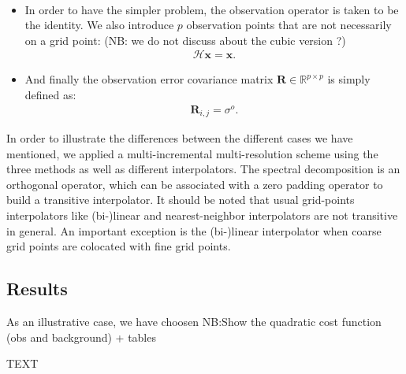 \documentclass[npg, manuscript]{copernicus}
\begin{document}
\begin{itemize}
\begin{align}
 \end{align}
 \item In order to have the simpler problem, the observation operator is taken to be the identity. We also introduce $p$ observation points that are not necessarily on a grid point: (NB: we do not discuss about the cubic version ?)
 \begin{align}
  \mathcal{H}\mathbf{x} = \mathbf{x}. 
 \end{align}
 \item And finally the observation error covariance matrix $\mathbf{R} \in \mathbb{R}^{p \times p}$ is simply defined as:
 \begin{align}
 \mathbf{R}_{i,j} = \sigma^o.
 \end{align}
\end{itemize}

In order to illustrate the differences between the different cases we have mentioned, we applied a multi-incremental multi-resolution scheme using the three methods as well as different interpolators. The spectral decomposition is an orthogonal operator, which can be associated with a zero padding operator to build a transitive interpolator. It should be noted that usual grid-points interpolators like (bi-)linear and nearest-neighbor interpolators are not transitive in general. An important exception is the (bi-)linear interpolator when coarse grid points are colocated with fine grid points.

\subsection{Results}
As an illustrative case, we have choosen 
NB:Show the quadratic cost function (obs and background) + tables



\conclusions  %
TEXT




\end{document}
